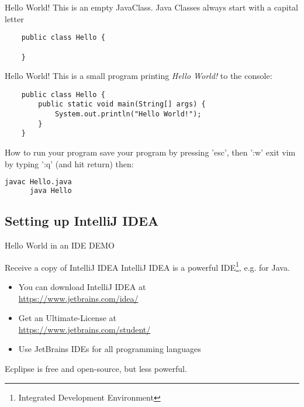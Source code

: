 \begin{frame}[fragile]{Hello World!}
	This is an empty JavaClass.
  Java Classes always start with a capital letter
	\begin{lstlisting}
	public class Hello {

	}
	\end{lstlisting}
\end{frame}

\begin{frame}[fragile]{Hello World!}
	This is a small program printing \emph{Hello World!} to the console:
	\begin{lstlisting}
	public class Hello {
	    public static void main(String[] args) {
	        System.out.println("Hello World!");
	    }
	}
	\end{lstlisting}
\end{frame}

\begin{frame}[fragile]{How to run your program}
   save your program by pressing 'esc', then ':w'
   exit vim by typing ':q' (and hit return)
   then:
   \begin{lstlisting}[language=bash]
      javac Hello.java
      java Hello
   \end{lstlisting}
\end{frame}

\subsection{Setting up IntelliJ IDEA}

\begin{frame}{Hello World in an IDE}
   DEMO
\end{frame}

\begin{frame}{Receive a copy of IntelliJ IDEA}
  IntelliJ IDEA is a powerful IDE\footnote{Integrated Development Environment}, e.g. for Java.
  \begin{itemize}
      \item You can download IntelliJ IDEA at  \\
          \url{https://www.jetbrains.com/idea/}
      \item Get an Ultimate-License at \\
          \url{https://www.jetbrains.com/student/}
      \item Use JetBrains IDEs for all programming languages
  \end{itemize}
  Ecplipse is free and open-source, but less powerful.
\end{frame}

